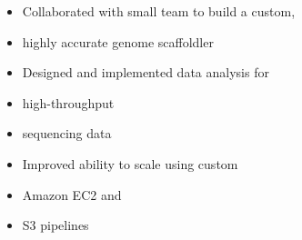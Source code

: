 \documentclass[12pt]{article}
\begin{document}
\begin{itemize}	
\item Collaborated with small team to build a custom, \\
\item highly accurate genome scaffoldler \\
\item Designed and implemented data analysis for \\
\item high-throughput \\
\item sequencing data \\
\item Improved ability to scale using custom \\
\item Amazon EC2 and \\
\item S3 pipelines \\
\end{itemize}
\end{document}
